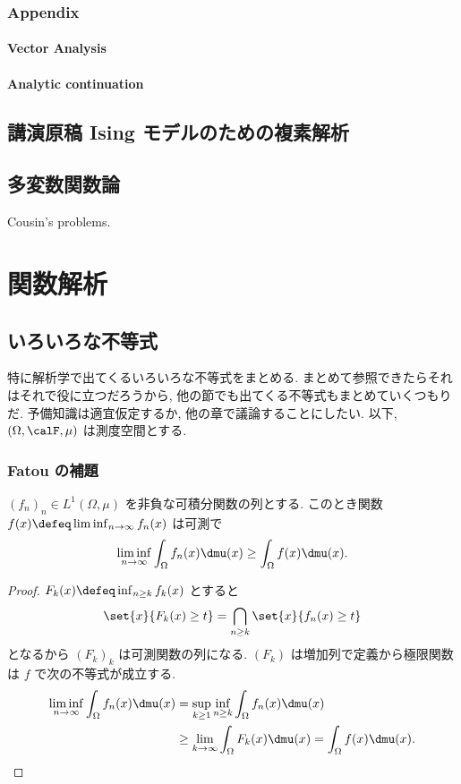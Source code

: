 \documentclass[openany, a4paper, oneside]{jsbook}
\begin{document}
\section{Appendix}

\subsection{Vector Analysis}

\subsection{Analytic continuation}

\chapter{講演原稿 Ising モデルのための複素解析}

\chapter{多変数関数論}

Cousin's problems.
\part{関数解析}

\chapter{いろいろな不等式}

特に解析学で出てくるいろいろな不等式をまとめる.
まとめて参照できたらそれはそれで役に立つだろうから, 他の節でも出てくる不等式もまとめていくつもりだ.
予備知識は適宜仮定するか, 他の章で議論することにしたい.
以下, $(\Omega, \calF, \mu)$ は測度空間とする.
\section{Fatou の補題}

\begin{prop}
$(f_n)_{n} \in L^1(\Omega, \mu)$ を非負な可積分関数の列とする.
このとき関数 $f(x) \defeq \liminf_{n \to \infty} f_{n}(x)$ は可測で
\begin{align}
 \liminf_{n \to \infty} \int_{\Omega} f_n (x) \dmu (x)
 \geq
 \int_{\Omega} f(x) \dmu (x).
\end{align}
\end{prop}
\begin{proof}
$F_k (x) \defeq \inf_{n \geq k} f_k(x)$ とすると
\begin{align}
 \set{x}{F_k(x) \geq t}
 =
 \bigcap_{n \geq k} \set{x}{f_n (x) \geq t}
\end{align}
となるから $(F_k)_{k}$ は可測関数の列になる.
$(F_k)$ は増加列で定義から極限関数は $f$ で次の不等式が成立する.
\begin{align}
 \liminf_{n \to \infty} \int_{\Omega} f_{n} (x) \dmu (x)
 &=
 \sup_{k \geq 1} \inf_{n \geq k} \int_{\Omega} f_{n} (x) \dmu (x) \\
 &\geq
 \lim_{k \to \infty} \int_{\Omega} F_k (x) \dmu (x)
 =
 \int_{\Omega} f(x) \dmu(x).
\end{align}
\end{proof}
\end{document}
